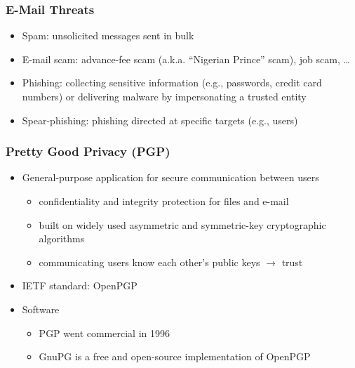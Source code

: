 \documentclass[final]{article}
\begin{document}
\subsubsection*{E-Mail Threats}
\begin{itemize}[nosep]
    \item Spam: unsolicited messages sent in bulk
    \item E-mail scam: advance-fee scam (a.k.a. ``Nigerian Prince'' scam), job scam, \dots
    \item Phishing: collecting sensitive information (e.g., passwords, credit card numbers) or delivering malware by impersonating a trusted entity
    \item Spear-phishing: phishing directed at specific targets (e.g., users)
\end{itemize}
\subsubsection*{Pretty Good Privacy (PGP)}
\begin{itemize}[nosep]
    \item General-purpose application for secure communication between users
          \begin{itemize}[nosep]
              \item confidentiality and integrity protection for files and e-mail
              \item built on widely used asymmetric and symmetric-key cryptographic algorithms
              \item communicating users know each other's public keys $\rightarrow$ trust
          \end{itemize}
    \item IETF standard: OpenPGP
    \item Software
          \begin{itemize}[nosep]
              \item PGP went commercial in 1996
              \item GnuPG is a free and open-source implementation of OpenPGP
          \end{itemize}
\end{itemize}
\end{document}
